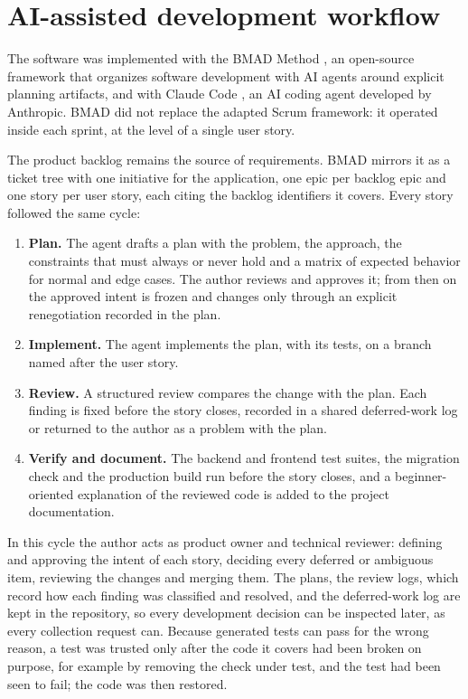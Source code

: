 \section{AI-assisted development workflow}
\label{sec:ai_assisted_workflow}

The software was implemented with the BMAD Method \autocite{bmad_method}, an open-source framework that organizes software development with AI agents around explicit planning artifacts, and with Claude Code \autocite{claude_code}, an AI coding agent developed by Anthropic. BMAD did not replace the adapted Scrum framework: it operated inside each sprint, at the level of a single user story.

The product backlog remains the source of requirements. BMAD mirrors it as a ticket tree with one initiative for the application, one epic per backlog epic and one story per user story, each citing the backlog identifiers it covers. Every story followed the same cycle:

\begin{enumerate}
    \item \textbf{Plan.} The agent drafts a plan with the problem, the approach, the constraints that must always or never hold and a matrix of expected behavior for normal and edge cases. The author reviews and approves it; from then on the approved intent is frozen and changes only through an explicit renegotiation recorded in the plan.

    \item \textbf{Implement.} The agent implements the plan, with its tests, on a branch named after the user story.

    \item \textbf{Review.} A structured review compares the change with the plan. Each finding is fixed before the story closes, recorded in a shared deferred-work log or returned to the author as a problem with the plan.

    \item \textbf{Verify and document.} The backend and frontend test suites, the migration check and the production build run before the story closes, and a beginner-oriented explanation of the reviewed code is added to the project documentation.
\end{enumerate}

In this cycle the author acts as product owner and technical reviewer: defining and approving the intent of each story, deciding every deferred or ambiguous item, reviewing the changes and merging them. The plans, the review logs, which record how each finding was classified and resolved, and the deferred-work log are kept in the repository, so every development decision can be inspected later, as every collection request can. Because generated tests can pass for the wrong reason, a test was trusted only after the code it covers had been broken on purpose, for example by removing the check under test, and the test had been seen to fail; the code was then restored.

